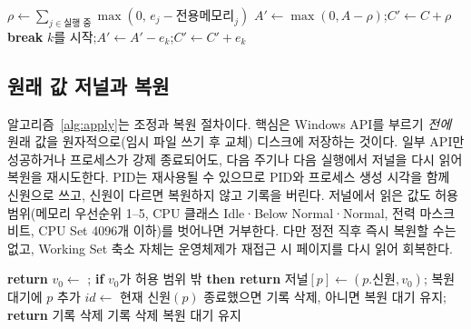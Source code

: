 \documentclass[11pt]{article}
\begin{document}
\begin{algorithm}[t]
\caption{배경 작업 입장 판단 (2초마다)}
\label{alg:queue}
\small
\begin{algorithmic}[1]
\State $\rho \gets \sum_{j\in\text{실행 중}} \max(0,\, e_j - \text{전용메모리}_j)$ 
\State $A' \gets \max(0, A - \rho)$;\quad $C' \gets C + \rho$
   \State \textbf{break}  \EndIf
  \State $k$를 시작;\quad $A' \gets A' - e_k$;\quad $C' \gets C' + e_k$
\EndWhile
\end{algorithmic}
\end{algorithm}

\subsection{원래 값 저널과 복원}
\label{sec:journal}
알고리즘~\ref{alg:apply}는 조정과 복원 절차이다. 핵심은 Windows API를 부르기 \emph{전에} 원래 값을 원자적으로(임시 파일 쓰기 후 교체) 디스크에 저장하는 것이다. 일부 API만 성공하거나 프로세스가 강제 종료되어도, 다음 주기나 다음 실행에서 저널을 다시 읽어 복원을 재시도한다. PID는 재사용될 수 있으므로 PID와 프로세스 생성 시각을 함께 신원으로 쓰고, 신원이 다르면 복원하지 않고 기록을 버린다. 저널에서 읽은 값도 허용 범위(메모리 우선순위 1--5, CPU 클래스 Idle·Below Normal·Normal, 전력 마스크 비트, CPU Set 4096개 이하)를 벗어나면 거부한다. 다만 정전 직후 즉시 복원할 수는 없고, Working Set 축소 자체는 운영체제가 재접근 시 페이지를 다시 읽어 회복한다.

\begin{algorithm}[t]
\caption{가역적 조정과 복원}
\label{alg:apply}
\small
\begin{algorithmic}[1]
   \State \textbf{return} \EndIf
  \State $v_0 \gets$ ; \textbf{if} $v_0$가 허용 범위 밖 \textbf{then return}
  \State 저널$[p] \gets (p.\text{신원}, v_0)$;  
   \State 복원 대기에 $p$ 추가 \EndIf
\EndProcedure
{}
  \State $id \gets$ 현재 신원$(p)$
   \State 종료했으면 기록 삭제, 아니면 복원 대기 유지; \textbf{return} \EndIf
   \State 기록 삭제 
   \State 기록 삭제
  \Else \State 복원 대기 유지 \EndIf
\EndProcedure
\end{algorithmic}
\end{algorithm}
\end{document}
